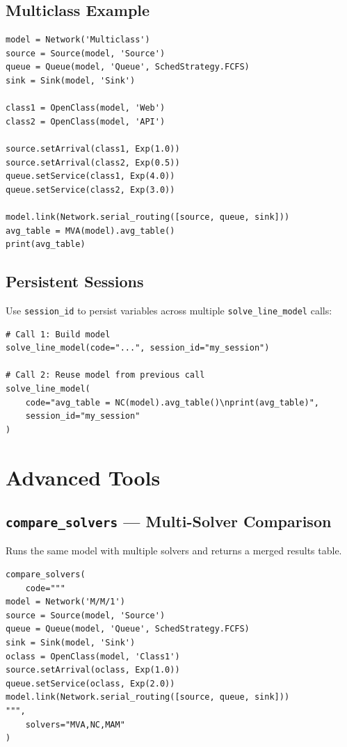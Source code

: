 \documentclass[11pt]{article}
\begin{document}
\subsection{Multiclass Example}

\begin{lstlisting}[style=pythonstyle]
model = Network('Multiclass')
source = Source(model, 'Source')
queue = Queue(model, 'Queue', SchedStrategy.FCFS)
sink = Sink(model, 'Sink')

class1 = OpenClass(model, 'Web')
class2 = OpenClass(model, 'API')

source.setArrival(class1, Exp(1.0))
source.setArrival(class2, Exp(0.5))
queue.setService(class1, Exp(4.0))
queue.setService(class2, Exp(3.0))

model.link(Network.serial_routing([source, queue, sink]))
avg_table = MVA(model).avg_table()
print(avg_table)
\end{lstlisting}

\subsection{Persistent Sessions}

Use \texttt{session\_id} to persist variables across multiple \texttt{solve\_line\_model} calls:

\begin{lstlisting}[style=pythonstyle]
# Call 1: Build model
solve_line_model(code="...", session_id="my_session")

# Call 2: Reuse model from previous call
solve_line_model(
    code="avg_table = NC(model).avg_table()\nprint(avg_table)",
    session_id="my_session"
)
\end{lstlisting}

\section{Advanced Tools}

\subsection{\texttt{compare\_solvers} --- Multi-Solver Comparison}

Runs the same model with multiple solvers and returns a merged results table.

\begin{lstlisting}[style=pythonstyle]
compare_solvers(
    code="""
model = Network('M/M/1')
source = Source(model, 'Source')
queue = Queue(model, 'Queue', SchedStrategy.FCFS)
sink = Sink(model, 'Sink')
oclass = OpenClass(model, 'Class1')
source.setArrival(oclass, Exp(1.0))
queue.setService(oclass, Exp(2.0))
model.link(Network.serial_routing([source, queue, sink]))
""",
    solvers="MVA,NC,MAM"
)
\end{lstlisting}
\end{document}
